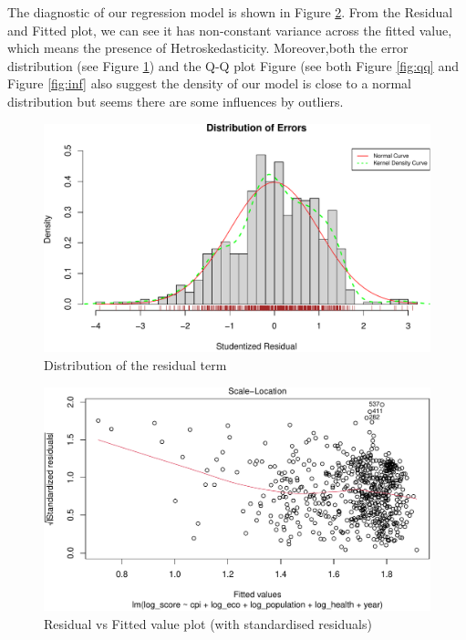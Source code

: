 \documentclass[11pt,a4paper,]{article}
\begin{document}
The diagnostic of our regression model is shown in Figure \ref{fig:resd}. From the Residual and Fitted plot, we can see it has non-constant variance across the fitted value, which means the presence of Hetroskedasticity. Moreover,both the error distribution (see Figure \ref{fig:density}) and the Q-Q plot Figure (see both Figure \ref{fig:qq} and Figure \ref{fig:inf} also suggest the density of our model is close to a normal distribution but seems there are some influences by outliers.

\begin{figure}
\centering
\includegraphics{Assignment4_files/figure-latex/density-1.pdf}
\caption{\label{fig:density}Distribution of the residual term}
\end{figure}

\begin{figure}
\centering
\includegraphics{Assignment4_files/figure-latex/resd-1.pdf}
\caption{\label{fig:resd}Residual vs Fitted value plot (with standardised residuals)}
\end{figure}
\end{document}
